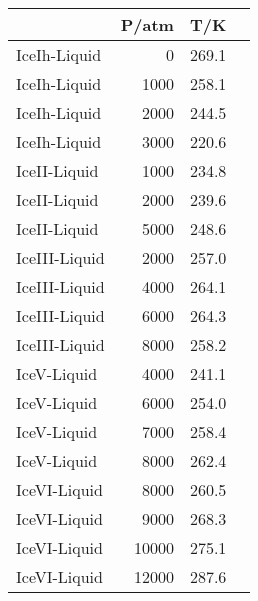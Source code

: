 \begin{tabular}{lrrl}
\hline\hline
&P/atm&T/K\\
\hline
IceIh-Liquid&0&269.1\\
IceIh-Liquid&1000&258.1\\
IceIh-Liquid&2000&244.5\\
IceIh-Liquid&3000&220.6\\
\hline
IceII-Liquid&1000&234.8\\
IceII-Liquid&2000&239.6\\
IceII-Liquid&5000&248.6\\
\hline
IceIII-Liquid&2000&257.0\\
IceIII-Liquid&4000&264.1\\
IceIII-Liquid&6000&264.3\\
IceIII-Liquid&8000&258.2\\
\hline
IceV-Liquid&4000&241.1\\
IceV-Liquid&6000&254.0\\
IceV-Liquid&7000&258.4\\
IceV-Liquid&8000&262.4\\
\hline
IceVI-Liquid&8000&260.5\\
IceVI-Liquid&9000&268.3\\
IceVI-Liquid&10000&275.1\\
IceVI-Liquid&12000&287.6\\
\hline
\hline\hline
\end{tabular}